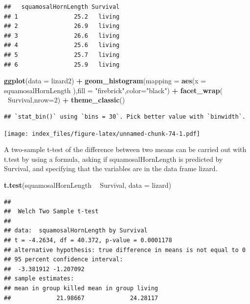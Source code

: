 \documentclass[]{article}
\newenvironment{Shaded}{\begin{snugshade}}{\end{snugshade}}
\newcommand{\DataTypeTok}[1]{\textcolor[rgb]{0.13,0.29,0.53}{#1}}
\newcommand{\DecValTok}[1]{\textcolor[rgb]{0.00,0.00,0.81}{#1}}
\newcommand{\KeywordTok}[1]{\textcolor[rgb]{0.13,0.29,0.53}{\textbf{#1}}}
\newcommand{\NormalTok}[1]{#1}
\newcommand{\OperatorTok}[1]{\textcolor[rgb]{0.81,0.36,0.00}{\textbf{#1}}}
\newcommand{\StringTok}[1]{\textcolor[rgb]{0.31,0.60,0.02}{#1}}
\begin{document}
\begin{verbatim}
##   squamosalHornLength Survival
## 1                25.2   living
## 2                26.9   living
## 3                26.6   living
## 4                25.6   living
## 5                25.7   living
## 6                25.9   living
\end{verbatim}

\begin{Shaded}
\begin{Highlighting}[]
\KeywordTok{ggplot}\NormalTok{(}\DataTypeTok{data =}\NormalTok{ lizard2) }\OperatorTok{+}
\StringTok{  }\KeywordTok{geom_histogram}\NormalTok{(}\DataTypeTok{mapping =} \KeywordTok{aes}\NormalTok{(}\DataTypeTok{x =}\NormalTok{ squamosalHornLength ),}\DataTypeTok{fill =} \StringTok{"firebrick"}\NormalTok{,}\DataTypeTok{color=}\StringTok{"black"}\NormalTok{) }\OperatorTok{+}\StringTok{ }
\StringTok{  }\KeywordTok{facet_wrap}\NormalTok{( }\OperatorTok{~}\NormalTok{Survival,}\DataTypeTok{nrow=}\DecValTok{2}\NormalTok{) }\OperatorTok{+}\StringTok{ }
\StringTok{  }\KeywordTok{theme_classic}\NormalTok{() }
\end{Highlighting}
\end{Shaded}

\begin{verbatim}
## `stat_bin()` using `bins = 30`. Pick better value with `binwidth`.
\end{verbatim}

\texttt{[image: index\_files/figure-latex/unnamed-chunk-74-1.pdf]}

A two-sample t-test of the difference between two means can be carried
out with t.test by using a formula, asking if squamosalHornLength is
predicted by Survival, and specifying that the variables are in the data
frame lizard.

\begin{Shaded}
\begin{Highlighting}[]
\KeywordTok{t.test}\NormalTok{(squamosalHornLength }\OperatorTok{~}\StringTok{ }\NormalTok{Survival, }\DataTypeTok{data =}\NormalTok{ lizard)}
\end{Highlighting}
\end{Shaded}

\begin{verbatim}
## 
##  Welch Two Sample t-test
## 
## data:  squamosalHornLength by Survival
## t = -4.2634, df = 40.372, p-value = 0.0001178
## alternative hypothesis: true difference in means is not equal to 0
## 95 percent confidence interval:
##  -3.381912 -1.207092
## sample estimates:
## mean in group killed mean in group living 
##             21.98667             24.28117
\end{verbatim}
\end{document}

